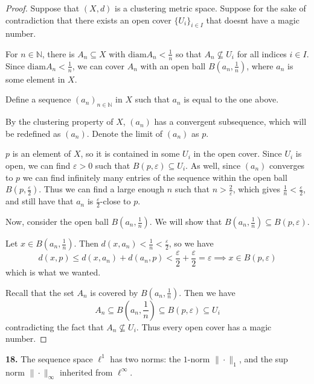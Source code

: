 \documentclass{article}
\newcommand{\diam}{\mathrm{diam}}
\theoremstyle{plain} %
\numberwithin{thm}{section} %
\theoremstyle{definition}
\begin{document}
    \begin{proof}
        Suppose that \((X,d)\) is a clustering metric space. Suppose for the sake of contradiction that there exists an open cover \(\{U_i\}_{i\in I}\) that doesnt have a magic number.

        For \(n \in \mathbb{N}\), there is \(A_n \subseteq X\) with \(\diam A_n < \frac{1}{n}\) so that \(A_n \nsubseteq U_i\) for all indices \(i \in I\). Since \(\diam A_n < \frac{1}{n}\), we can cover \(A_n\) with an open ball \(B(a_n, \frac{1}{n})\), where \(a_n\) is some element in \(X\).

        Define a sequence \((a_n)_{n\in \mathbb{N}}\) in \(X\) such that \(a_n\) is equal to the one above.

        By the clustering property of \(X\), \((a_n)\) has a convergent subsequence, which will be redefined as \((a_n)\). Denote the limit of \((a_n)\) as \(p\).

        \(p\) is an element of \(X\), so it is contained in some \(U_i\) in the open cover. Since \(U_i\) is open, we can find \(\varepsilon > 0\) such that \(B(p, \varepsilon) \subseteq U_i\). As well, since \((a_n)\) converges to \(p\) we can find infinitely many entries of the sequence within the open ball \(B(p, \frac{\varepsilon}{2})\). Thus we can find a large enough \(n\) such that \(n > \frac{2}{\varepsilon}\), which gives \(\frac{1}{n} < \frac{\varepsilon}{2}\), and still have that \(a_n\) is \(\frac{\varepsilon}{2}\)-close to \(p\).

        Now, consider the open ball \(B(a_n, \frac{1}{n})\). We will show that \(B(a_n, \frac{1}{n}) \subseteq B(p, \varepsilon)\).

        Let \(x \in B(a_n, \frac{1}{n})\). Then \(d(x, a_n) < \frac{1}{n} < \frac{\varepsilon}{2}\), so we have
        \[
            d(x,p) \leq d(x,a_n) + d(a_n,p) < \frac{\varepsilon}{2} + \frac{\varepsilon}{2} = \varepsilon \implies x \in B(p, \varepsilon)
        \]
        which is what we wanted.

        Recall that the set \(A_n\) is covered by \(B(a_n, \frac{1}{n})\). Then we have
        \[
            A_n \subseteq B(a_n, \frac{1}{n}) \subseteq B(p, \varepsilon) \subseteq U_i
        \]
        contradicting the fact that \(A_n \nsubseteq U_i\). Thus every open cover has a magic number.

    \end{proof}
    \pagebreak
    \noindent\textbf{18.} The sequence space $\ell^1$ has two norms: the $1$-norm $\|\cdot\|_1$, and the sup norm $\|\cdot\|_\infty$ inherited from $\ell^\infty$.
\end{document}
